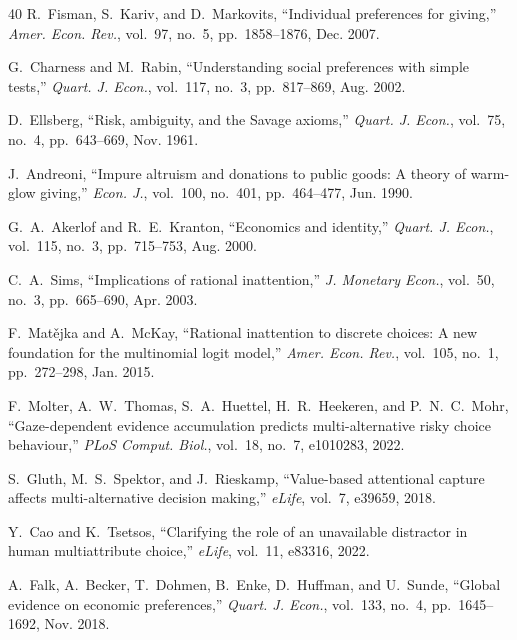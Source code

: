 \documentclass[journal]{IEEEtran}
\begin{document}
\begin{thebibliography}{40}
R.~Fisman, S.~Kariv, and D.~Markovits, ``Individual preferences for giving,''
\emph{Amer. Econ. Rev.}, vol.~97, no.~5, pp.~1858--1876, Dec. 2007.

G.~Charness and M.~Rabin, ``Understanding social preferences with simple tests,''
\emph{Quart. J. Econ.}, vol.~117, no.~3, pp.~817--869, Aug. 2002.

D.~Ellsberg, ``Risk, ambiguity, and the Savage axioms,''
\emph{Quart. J. Econ.}, vol.~75, no.~4, pp.~643--669, Nov. 1961.

J.~Andreoni, ``Impure altruism and donations to public goods: A theory of warm-glow giving,''
\emph{Econ. J.}, vol.~100, no.~401, pp.~464--477, Jun. 1990.

G.~A.~Akerlof and R.~E.~Kranton, ``Economics and identity,''
\emph{Quart. J. Econ.}, vol.~115, no.~3, pp.~715--753, Aug. 2000.

C.~A.~Sims, ``Implications of rational inattention,''
\emph{J. Monetary Econ.}, vol.~50, no.~3, pp.~665--690, Apr. 2003.

F.~Mat\v{e}jka and A.~McKay, ``Rational inattention to discrete choices: A new foundation for the multinomial logit model,''
\emph{Amer. Econ. Rev.}, vol.~105, no.~1, pp.~272--298, Jan. 2015.

F.~Molter, A.~W.~Thomas, S.~A.~Huettel, H.~R.~Heekeren, and P.~N.~C.~Mohr, ``Gaze-dependent evidence accumulation predicts multi-alternative risky choice behaviour,''
\emph{PLoS Comput. Biol.}, vol.~18, no.~7, e1010283, 2022. %

S.~Gluth, M.~S.~Spektor, and J.~Rieskamp, ``Value-based attentional capture affects multi-alternative decision making,''
\emph{eLife}, vol.~7, e39659, 2018.

Y.~Cao and K.~Tsetsos, ``Clarifying the role of an unavailable distractor in human multiattribute choice,''
\emph{eLife}, vol.~11, e83316, 2022. %

A.~Falk, A.~Becker, T.~Dohmen, B.~Enke, D.~Huffman, and U.~Sunde, ``Global evidence on economic preferences,''
\emph{Quart. J. Econ.}, vol.~133, no.~4, pp.~1645--1692, Nov. 2018. %

\end{thebibliography}

\balance
\end{document}
